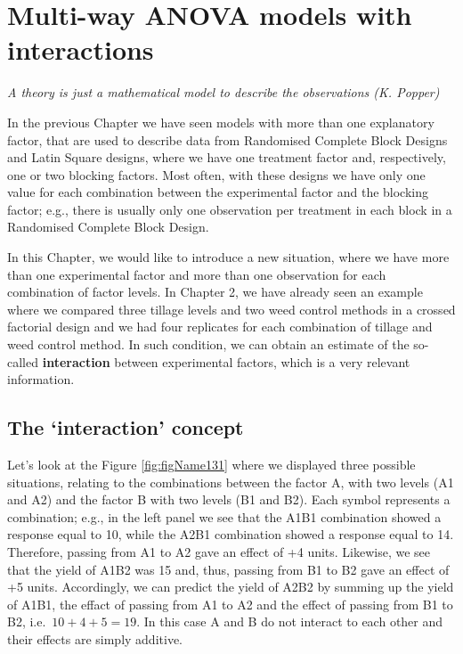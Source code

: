 \documentclass[a4paper,12pt,oneside]{book}
\begin{document}
\hypertarget{multi-way-anova-models-with-interactions}{%
\chapter{Multi-way ANOVA models with interactions}\label{multi-way-anova-models-with-interactions}}

\emph{A theory is just a mathematical model to describe the observations (K. Popper)}

In the previous Chapter we have seen models with more than one explanatory factor, that are used to describe data from Randomised Complete Block Designs and Latin Square designs, where we have one treatment factor and, respectively, one or two blocking factors. Most often, with these designs we have only one value for each combination between the experimental factor and the blocking factor; e.g., there is usually only one observation per treatment in each block in a Randomised Complete Block Design.

In this Chapter, we would like to introduce a new situation, where we have more than one experimental factor and more than one observation for each combination of factor levels. In Chapter 2, we have already seen an example where we compared three tillage levels and two weed control methods in a crossed factorial design and we had four replicates for each combination of tillage and weed control method. In such condition, we can obtain an estimate of the so-called \textbf{interaction} between experimental factors, which is a very relevant information.

\hypertarget{the-interaction-concept}{%
\section{The `interaction' concept}\label{the-interaction-concept}}

Let's look at the Figure \ref{fig:figName131} where we displayed three possible situations, relating to the combinations between the factor A, with two levels (A1 and A2) and the factor B with two levels (B1 and B2). Each symbol represents a combination; e.g., in the left panel we see that the A1B1 combination showed a response equal to 10, while the A2B1 combination showed a response equal to 14. Therefore, passing from A1 to A2 gave an effect of +4 units. Likewise, we see that the yield of A1B2 was 15 and, thus, passing from B1 to B2 gave an effect of +5 units. Accordingly, we can predict the yield of A2B2 by summing up the yield of A1B1, the effact of passing from A1 to A2 and the effect of passing from B1 to B2, i.e.~\(10 + 4 + 5 = 19\). In this case A and B do not interact to each other and their effects are simply additive.
\end{document}
